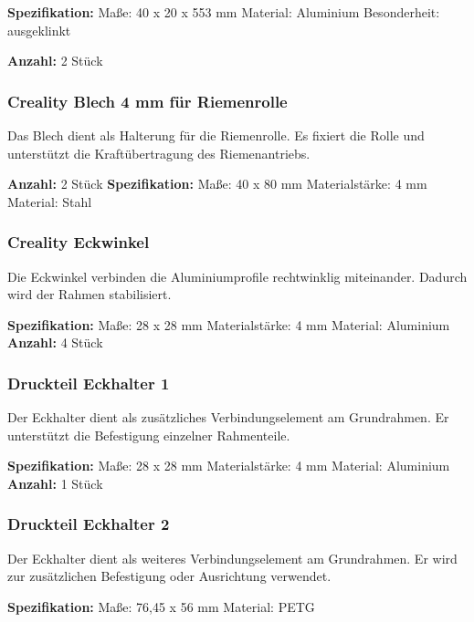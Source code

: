 \textbf{Spezifikation:}
Maße: 40 x 20 x 553 mm
Material: Aluminium
Besonderheit: ausgeklinkt

\textbf{Anzahl:} 2 Stück

\subsubsection{Creality Blech 4 mm für Riemenrolle}

Das Blech dient als Halterung für die Riemenrolle. Es fixiert die Rolle und unterstützt die Kraftübertragung des Riemenantriebs.



\textbf{Anzahl:} 2 Stück
\textbf{Spezifikation:}
Maße: 40 x 80 mm
Materialstärke: 4 mm
Material: Stahl

\subsubsection{Creality Eckwinkel}

Die Eckwinkel verbinden die Aluminiumprofile rechtwinklig miteinander. Dadurch wird der Rahmen stabilisiert.


\textbf{Spezifikation:}
Maße: 28 x 28 mm
Materialstärke: 4 mm
Material: Aluminium
\textbf{Anzahl:} 4 Stück



\subsubsection{Druckteil Eckhalter 1}

Der Eckhalter dient als zusätzliches Verbindungselement am Grundrahmen. Er unterstützt die Befestigung einzelner Rahmenteile.


\textbf{Spezifikation:}
Maße: 28 x 28 mm
Materialstärke: 4 mm
Material: Aluminium
\textbf{Anzahl:} 1 Stück

\subsubsection{Druckteil Eckhalter 2}

Der Eckhalter dient als weiteres Verbindungselement am Grundrahmen. Er wird zur zusätzlichen Befestigung oder Ausrichtung verwendet.

\textbf{Spezifikation:}
Maße: 76,45 x 56 mm
Material: PETG

